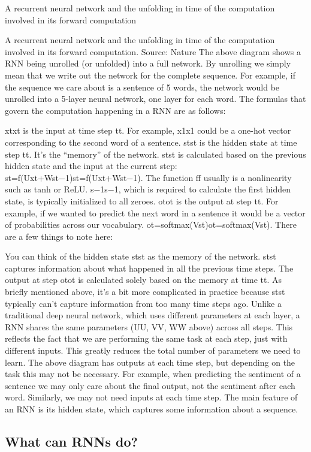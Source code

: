 A recurrent neural network and the unfolding in time of the computation involved in its forward computation

A recurrent neural network and the unfolding in time of the computation involved in its forward computation. Source: Nature The above diagram shows a RNN being unrolled (or unfolded) into a full network. By unrolling we simply mean that we write out the network for the complete sequence. For example, if the sequence we care about is a sentence of 5 words, the network would be unrolled into a 5-layer neural network, one layer for each word. The formulas that govern the computation happening in a RNN are as follows:

xtxt is the input at time step tt. For example, x1x1 could be a one-hot vector corresponding to the second word of a sentence.
stst is the hidden state at time step tt. It’s the “memory” of the network. stst is calculated based on the previous hidden state and the input at the current step: st=f(Uxt+Wst−1)st=f(Uxt+Wst−1). The function ff usually is a nonlinearity such as tanh or ReLU. s−1s−1, which is required to calculate the first hidden state, is typically initialized to all zeroes.
otot is the output at step tt. For example, if we wanted to predict the next word in a sentence it would be a vector of probabilities across our vocabulary. ot=softmax(Vst)ot=softmax(Vst).
There are a few things to note here:

You can think of the hidden state stst as the memory of the network. stst captures information about what happened in all the previous time steps. The output at step otot is calculated solely based on the memory at time tt. As briefly mentioned above, it’s a bit more complicated in practice because stst typically can’t capture information from too many time steps ago.
Unlike a traditional deep neural network, which uses different parameters at each layer, a RNN shares the same parameters (UU, VV, WW above) across all steps. This reflects the fact that we are performing the same task at each step, just with different inputs. This greatly reduces the total number of parameters we need to learn.
The above diagram has outputs at each time step, but depending on the task this may not be necessary. For example, when predicting the sentiment of a sentence we may only care about the final output, not the sentiment after each word. Similarly, we may not need inputs at each time step. The main feature of an RNN is its hidden state, which captures some information about a sequence.

\subsection{What can RNNs do?}

